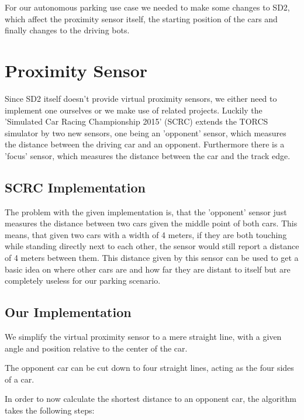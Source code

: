 \documentclass[paper=a4, fontsize=11pt]{scrreprt}
\begin{document}
For our autonomous parking use case we needed to make some changes to SD2,
which affect the proximity sensor itself, the starting position of the cars
and finally changes to the driving bots.

\section{Proximity Sensor}
Since SD2 itself doesn't provide virtual proximity sensors,
we either need to implement one ourselves or we make use of related projects.
Luckily the 'Simulated Car Racing Championship 2015' (SCRC) \cite{scrc2015} extends the TORCS simulator by two new sensors,
one being an 'opponent' sensor, which measures the distance between the driving car and an opponent.
Furthermore there is a 'focus' sensor, which measures the distance between the car and the track edge.

\subsection{SCRC Implementation}
The problem with the given implementation is,
that the 'opponent' sensor just measures the distance between two cars given the middle point of both cars.
This means, that given two cars with a width of 4 meters,
if they are both touching while standing directly next to each other,
the sensor would still report a distance of 4 meters between them.
This distance given by this sensor can be used to get a basic idea on where other cars are
and how far they are distant to itself but are completely useless for our parking scenario.

\subsection{Our Implementation}
We simplify the virtual proximity sensor to a mere straight line,
with a given angle and position relative to the center of the car.

The opponent car can be cut down to four straight lines,
acting as the four sides of a car.

In order to now calculate the shortest distance to an opponent car,
the algorithm takes the following steps:
\end{document}
